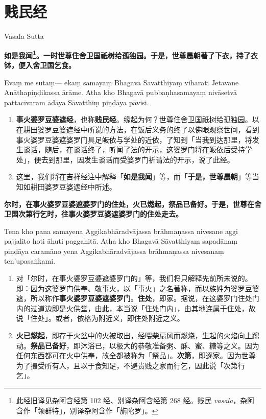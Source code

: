 \section{贱民经}

\begin{center}Vasala Sutta\end{center}\vspace{1em}

\textbf{如是我闻\footnote{此经旧译见杂阿含经第 102 经、别译杂阿含经第 268 经。贱民 \textit{vasala}，杂阿含作「领群特」，别译杂阿含作「旃陀罗」。}。一时世尊住舍卫国祇树给孤独园。于是，世尊晨朝著了下衣，持了衣钵，便入舍卫国乞食。}

Evaṃ me sutaṃ— ekaṃ samayaṃ Bhagavā Sāvatthiyaṃ viharati Jetavane Anāthapiṇḍikassa ārāme. Atha kho Bhagavā pubbaṇhasamayaṃ nivāsetvā pattacīvaram ādāya Sāvatthiṃ piṇḍāya pāvisi.

\begin{enumerate}\item \textbf{事火婆罗豆婆遮经}，也称\textbf{贱民经}。缘起为何？世尊住舍卫国祇树给孤独园。以在耕田婆罗豆婆遮经中所说的方法，在饭后义务的终了以佛眼观察世间，看到事火婆罗豆婆遮婆罗门具足皈依与学处的近依，了知到「当我到达那里，将发生谈话，随后，在谈话终了，听闻了法的开示，这婆罗门将在皈依后受持学处」，便去到那里，因发生谈话而受婆罗门祈请法的开示，说了此经。
\item 这里，我们将在吉祥经注中解释「\textbf{如是我闻}」等，而「\textbf{于是，世尊晨朝}」等当知如耕田婆罗豆婆遮经中所述。\end{enumerate}

\textbf{尔时，在事火婆罗豆婆遮婆罗门的住处，火已燃起，祭品已备好。于是，世尊在舍卫国次第行乞时，往事火婆罗豆婆遮婆罗门的住处走去。}

Tena kho pana samayena Aggikabhāradvājassa brāhmaṇassa nivesane aggi pajjalito hoti āhuti paggahitā. Atha kho Bhagavā Sāvatthiyaṃ sapadānaṃ piṇḍāya caramāno yena Aggikabhāradvājassa brāhmaṇassa nivesanaṃ ten’upasaṅkami.

\begin{enumerate}\item 对「尔时，在事火婆罗豆婆遮婆罗门的」等，我们将只解释先前所未说的。即：因为这婆罗门供奉、敬事火，以「事火」之名著称，而以族姓为婆罗豆婆遮，所以称作\textbf{事火婆罗豆婆遮婆罗门}。\textbf{住处}，即家。据说，在这婆罗门住处门内的过道边即是火供堂，由此，本当说「住处门内」，由其地连属于住处，故说「住处」。或者，依格为附近义，即住处附近之义。
\item \textbf{火已燃起}，即存于火盆中的火被取出，经喂柴扇风而燃烧，生起的火焰向上蹿动。\textbf{祭品已备好}，即沐浴已，以极大的恭敬准备粥、酥、蜜、糖等之义。因为任何东西都可在火中供奉，故全都被称为「祭品」。\textbf{次第}，即逐家。因为世尊为了摄受所有人，且以于食知足，不避贵贱之家而行乞，因此说「次第行乞」。\end{enumerate}

